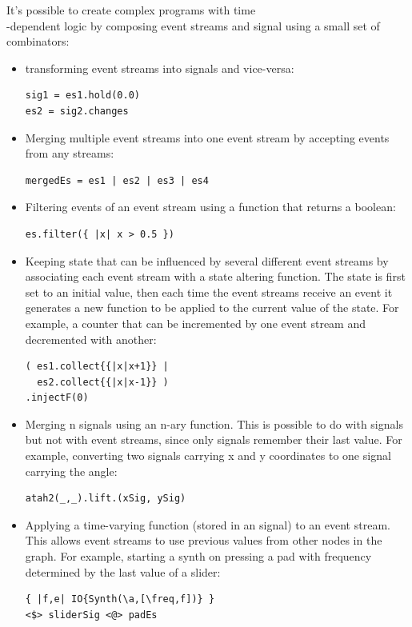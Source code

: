 \documentclass{article}
\begin{document}
It's possible to create complex programs with time\\-dependent logic by composing  event streams and signal using a small set of combinators:

\begin{itemize}

\item transforming event streams into signals and vice-versa:
\begin{Verbatim}
sig1 = es1.hold(0.0)
es2 = sig2.changes
\end{Verbatim}
\item Merging multiple event streams into one event stream by accepting events from any streams:
\begin{Verbatim}
mergedEs = es1 | es2 | es3 | es4
\end{Verbatim}
\item Filtering events of an event stream using a function that returns a boolean:
\begin{Verbatim}
es.filter({ |x| x > 0.5 })
\end{Verbatim}
\item Keeping state that can be influenced by several different event streams by  associating each event stream with a state altering function. The state is first set to an initial value, then each time the event streams receive an event it generates a new function to be applied to the current value of the state. For example, a counter that can be incremented by one event stream and decremented with another:
\begin{Verbatim}
( es1.collect{{|x|x+1}} | 
  es2.collect{{|x|x-1}} )
.injectF(0) 
\end{Verbatim}
\item Merging n signals using an n-ary function. This is possible to do with signals but not with event streams, since only signals remember their last value. For example, converting two signals carrying x and y coordinates to one signal carrying the angle: 
\begin{Verbatim}
atah2(_,_).lift.(xSig, ySig)
\end{Verbatim}
\item Applying a time-varying function (stored in an signal) to an event stream. This allows event streams to use previous values from other nodes in the graph. For example, starting a synth on pressing a pad with frequency determined by the last value of a slider:
\begin{Verbatim}
{ |f,e| IO{Synth(\a,[\freq,f])} }
<$> sliderSig <@> padEs 

\end{Verbatim}
\end{itemize}
\end{document}
